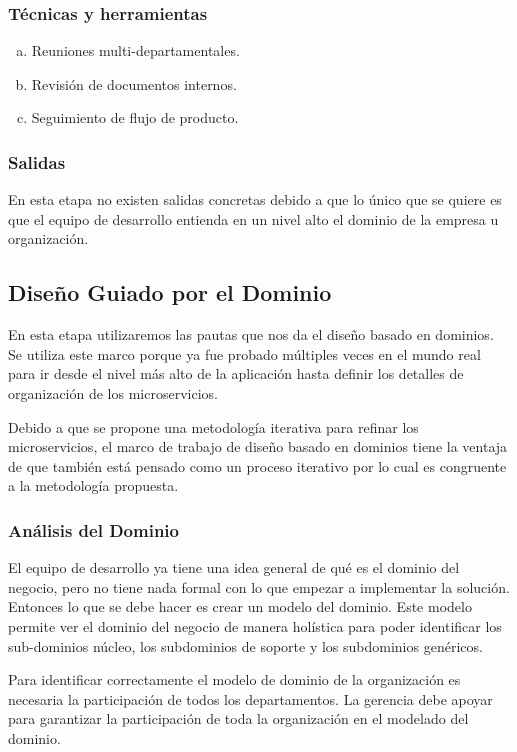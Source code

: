 \subsubsection*{Técnicas y herramientas}
\begin{enumerate}[a.]
	\item Reuniones multi-departamentales.
	\item Revisión de documentos internos.
	\item Seguimiento de flujo de producto.
\end{enumerate}

\subsubsection*{Salidas}
En esta etapa no existen salidas concretas debido a que lo único que se quiere es que el equipo
de desarrollo entienda en un nivel alto el dominio de la empresa u organización.

\subsection{Diseño Guiado por el Dominio}

En esta etapa utilizaremos las pautas que nos da el diseño basado en dominios.
Se utiliza este marco porque ya fue probado múltiples veces en el mundo real para ir desde
el nivel más alto de la aplicación hasta definir los detalles de organización de los microservicios.

Debido a que se propone una metodología iterativa para refinar los microservicios, el marco de trabajo
de diseño basado en dominios tiene la ventaja de que también está pensado como un proceso iterativo
por lo cual es congruente a la metodología propuesta.

\subsubsection{Análisis del Dominio}

El equipo de desarrollo ya tiene una idea general de qué es el dominio del negocio, pero no tiene
nada formal con lo que empezar a implementar la solución.
Entonces lo que se debe hacer es crear un modelo del dominio.
Este modelo permite ver el dominio del negocio de manera holística para poder identificar
los sub-dominios núcleo, los subdominios de soporte y los subdominios genéricos.

Para identificar correctamente el modelo de dominio de la organización es necesaria la participación
de todos los departamentos.
La gerencia debe apoyar para garantizar la participación de toda la organización en el modelado del dominio.

